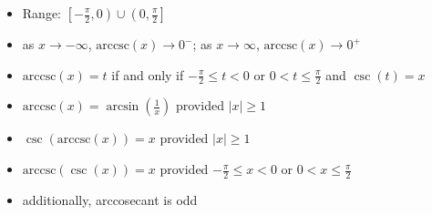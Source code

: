 \documentclass[12pt]{ximera}
\begin{document}
\begin{theorem}
\begin{itemize}
\begin{itemize}
\item Range:  $\left[-\frac{\pi}{2}, 0 \right) \cup \left(0, \frac{\pi}{2} \right]$

\item  as $x \rightarrow -\infty$, $\mbox{arccsc}(x) \rightarrow 0^{-}$;  as $x \rightarrow \infty$, $\mbox{arccsc}(x) \rightarrow 0^{+}$

\item  $\mbox{arccsc}(x) = t$ if and only if $-\frac{\pi}{2} \leq t < 0$ or $0 < t \leq \frac{\pi}{2}$ and $\csc(t) = x$

\item  $\mbox{arccsc}(x) = \arcsin\left(\frac{1}{x}\right)$ provided $|x| \geq 1$

\item  $\csc\left(\mbox{arccsc}(x)\right) = x$ provided $|x| \geq 1$

\item  $\mbox{arccsc}(\csc(x)) = x$ provided $-\frac{\pi}{2} \leq x < 0$ or $0 < x \leq \frac{\pi}{2}$

\item additionally, arccosecant is odd

\end{itemize}

\end{itemize}

\end{theorem}


\medskip
\end{document}

